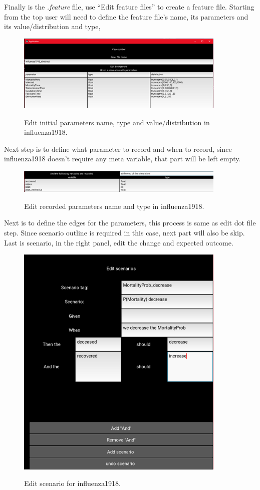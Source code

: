 Finally is the \textsl{.feature} file, use “Edit feature files” to create a feature file. Starting from the top user will need to define the feature file’s name, its parameters and its value/distribution and type,
\begin{figure}[H]
	\centering
	\includegraphics[width=10cm]{figures/influenzaTestProcess10.png}\\
	\caption{Edit initial parameters name, type and value/distribution in influenza1918.}
	\label{fig:figure28}
\end{figure}
\noindent 
Next step is to define what parameter to record and when to record, since influenza1918 doesn’t require any meta variable, that part will be left empty.
\begin{figure}[H]
	\centering
	\includegraphics[width=10cm]{figures/influenzaTestProcess11.png}\\
	\caption{Edit recorded parameters name and type in influenza1918.}
	\label{fig:figure29}
\end{figure}
\noindent 
Next is to define the edges for the parameters, this process is same as edit dot file step. Since scenario outline is required in this case, next part will also be skip. Last is scenario, in the right panel, edit the change and expected outcome. 
\begin{figure}[H]
	\centering
	\includegraphics[width=10cm]{figures/influenzaTestProcess12.png}\\
	\caption{Edit scenario for influenza1918.}
	\label{fig:figure30}
\end{figure}
